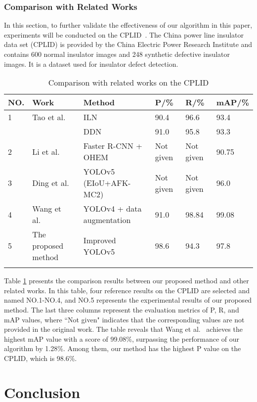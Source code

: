 \documentclass[sn-mathphys,Numbered]{sn-jnl}%
\theoremstyle{thmstyleone}%
\theoremstyle{thmstyletwo}%
\theoremstyle{thmstylethree}%
\begin{document}
\subsubsection {Comparison with Related Works}
In this section, to further validate the effectiveness of our algorithm in this paper, experiments will be conducted on the CPLID~\cite{tao2018detection}. The China power line insulator data set (CPLID) is provided by the China Electric Power Research Institute and contains 600 normal insulator images and 248 synthetic defective insulator images. It is a dataset used for insulator defect detection.

\begin{table}[h]
\caption{Comparison with related works on the CPLID}\label{tab5}
\begin{tabular*}{\textwidth}{@{\extracolsep\fill}llllll}
\toprule%
NO. & Work & Method & P/\% & R/\% & mAP/\%  \\
\midrule
1 & Tao et al.~\cite{tao2018detection} & ILN & 90.4 & 96.6 & 93.4 \\
& & DDN & 91.0 & 95.8 & 93.3\\
2 & Li et al.~\cite{li2020insulator} & Faster R-CNN + OHEM & Not given & Not given & 90.75\\
3 & Ding et al.~\cite{ding2022high} & YOLOv5 (EIoU+AFK-MC2)  & Not given & Not given & 96.0\\
4 & Wang et al.~\cite{wang2023insulator} & YOLOv4 + data augmentation & 91.0 & 98.84 & 99.08\\
5 & The proposed method & Improved YOLOv5 & 98.6 & 94.3 & 97.8\\
\botrule
\end{tabular*}
\end{table}

Table \ref{tab5} presents the comparison results between our proposed method and other related works. In this table, four reference results on the CPLID are selected and named NO.1-NO.4, and NO.5 represents the experimental results of our proposed method. The last three columns represent the evaluation metrics of P, R, and mAP values, where ``Not given" indicates that the corresponding values are not provided in the original work. The table reveals that Wang et al.~\cite{wang2023insulator} achieves the highest mAP value with a score of 99.08\%, surpassing the performance of our algorithm by 1.28\%. Among them, our method has the highest P value on the CPLID, which is 98.6\%.


\section {Conclusion}\label {sec4}
\end{document}
